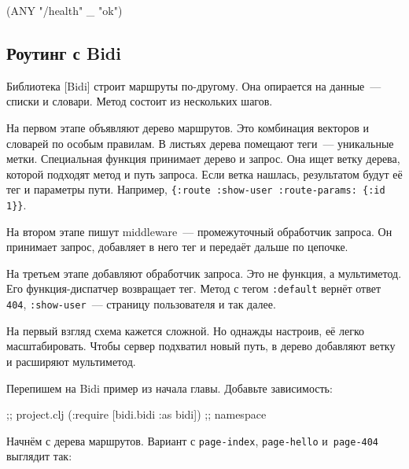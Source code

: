 \begin{english}
  \begin{clojure}
(ANY "/health" _ "ok")
  \end{clojure}
\end{english}

\subsection{Роутинг с Bidi}


Библиотека [Bidi] строит маршруты
по-другому. Она опирается на данные~--- списки и словари. Метод состоит из
нескольких шагов.

На первом этапе объявляют дерево маршрутов. Это комбинация векторов и словарей
по особым правилам. В листьях дерева помещают теги~--- уникальные
метки. Специальная функция принимает дерево и запрос. Она ищет ветку дерева,
которой подходят метод и путь запроса. Если ветка нашлась, результатом будут
её тег и параметры пути. Например, \verb|{:route :show-user :route-params: {:id 1}}|.


На втором этапе пишут middleware~--- промежуточный обработчик запроса. Он
принимает запрос, добавляет в него тег и передаёт дальше по цепочке.

На третьем этапе добавляют обработчик запроса. Это не функция, а мультиметод.
Его функция-диспатчер возвращает тег. Метод с тегом \verb|:default| вернёт
ответ \verb|404|, \verb|:show-user|~--- страницу пользователя и так далее.

На первый взгляд схема кажется сложной. Но однажды настроив, её легко
масштабировать. Чтобы сервер подхватил новый путь, в дерево добавляют ветку и
расширяют мультиметод.


Перепишем на Bidi пример из начала главы. Добавьте зависимость:

\begin{english}
  \begin{clojure}
[bidi "2.1.5"]                  ;; project.clj
(:require [bidi.bidi :as bidi]) ;; namespace
  \end{clojure}
\end{english}

Начнём с дерева маршрутов. Вариант с \verb|page-index|, \verb|page-hello|
и~\verb|page-404| выглядит так:

